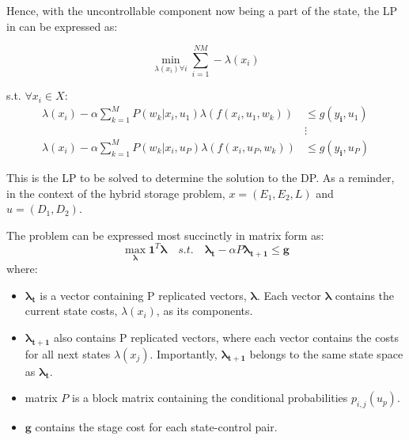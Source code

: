 \documentclass[conference]{IEEEtran}
\begin{document}
Hence, with the uncontrollable component now being a part of the state, the LP in \cite{Bertsekas:2007:DPO:1396348} can be expressed as:

\begin{equation} \label{eq:prelimLP}
\min_{\lambda(x_{i}) \forall i} \sum_{i=1}^{NM} -\lambda(x_{i})
\end{equation}

s.t. $\forall x_{i} \in X$: \begin{align*}
\lambda(x_{i})-\alpha\sum_{k=1}^{M}P(w_{k} | x_{i},u_{1})\lambda(f(x_{i},u_{1},w_{k})) &\leq g(y_{\textbf{i}},u_{1}) \\
&\vdots\\
\lambda(x_{i})-\alpha\sum_{k=1}^{M}P(w_{k} | x_{i},u_{P})\lambda(f(x_{i},u_{P},w_{k})) &\leq g(y_{\textbf{i}},u_{P})
\end{align*}

This is the LP to be solved to determine the solution to the DP. As a reminder, in the context of the hybrid storage problem, $x=(E_{1},E_{2},L)$ and $u=(D_{1},D_{2})$.

The problem can be expressed most succinctly in matrix form as:
\begin{equation} \label{eq:prelimLPmtx}
    \max_{\boldsymbol{\lambda}} \boldsymbol{1}^{T} \boldsymbol{\lambda}
    \hspace{1em}s.t.\hspace{1em}
    \boldsymbol{\lambda_{t}}-\alpha P\boldsymbol{\lambda_{t+1}} \leq \boldsymbol{g}
\end{equation} where:

\begin{itemize}
	\item $\boldsymbol{\lambda_{t}}$ is a vector containing P replicated vectors, $\boldsymbol{\lambda}$. Each vector $\boldsymbol{\lambda}$ contains the current state costs, $\lambda(x_{i})$, as its components. %
	
	\item $\boldsymbol{\lambda_{t+1}}$ also contains P replicated vectors, where each vector contains the costs for all next states $\lambda(x_{j})$. Importantly, $\boldsymbol{\lambda_{t+1}}$ belongs to the same state space as $\boldsymbol{\lambda_{t}}$. %
	
	\item matrix $P$ is a block  matrix containing the conditional probabilities $p_{i,j}(u_{p})$. %
	
	\item $\boldsymbol{g}$ contains the stage cost for each state-control pair. %
\end{itemize}
\end{document}
